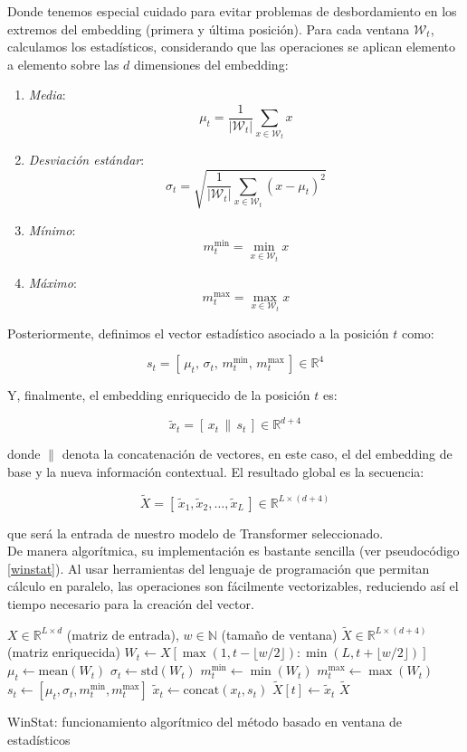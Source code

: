 Donde tenemos especial cuidado para evitar problemas de desbordamiento en los extremos del embedding (primera y última posición). Para cada ventana $\mathcal{W}_t$, calculamos los estadísticos, considerando que las operaciones se aplican elemento a elemento sobre las $d$ dimensiones del embedding:

\begin{enumerate}
	\item \textit{Media}:
	\[
	\mu_t = \frac{1}{|\mathcal{W}_t|} \sum_{x \in \mathcal{W}_t} x
	\]
	\item \textit{Desviación estándar}:
	\[
	\sigma_t = \sqrt{ \frac{1}{|\mathcal{W}_t|} \sum_{x \in \mathcal{W}_t} (x - \mu_t)^2 }
	\]
	\item \textit{Mínimo}:
	\[
	m^{\min}_t = \min_{x \in \mathcal{W}_t} x
	\]
	\item \textit{Máximo}:
	\[
	m^{\max}_t = \max_{x \in \mathcal{W}_t} x
	\]
\end{enumerate}

Posteriormente, definimos el vector estadístico asociado a la posición $t$ como:

\[
s_t = [\,\mu_t,\, \sigma_t,\, m^{\min}_t,\, m^{\max}_t\,] \in \mathbb{R}^{4}
\]

Y, finalmente, el embedding enriquecido de la posición $t$ es:

\[
\tilde{x}_t = [\,x_t \, \| \, s_t\,] \in \mathbb{R}^{d+4}
\]

donde $\|$ denota la concatenación de vectores, en este caso, el del embedding de base y la nueva información contextual. El resultado global es la secuencia:

\[
\tilde{X} = [\,\tilde{x}_1, \tilde{x}_2, \dots, \tilde{x}_L\,] \in \mathbb{R}^{L \times (d+4)}
\]

que será la entrada de nuestro modelo de Transformer seleccionado.\\

De manera algorítmica, su implementación es bastante sencilla (ver pseudocódigo \ref{winstat}). Al usar herramientas del lenguaje de programación que permitan cálculo en paralelo, las operaciones son fácilmente vectorizables, reduciendo así el tiempo necesario para la creación del vector.



\begin{algorithm}[H]
	\begin{algorithmic}[1]
		\REQUIRE $X \in \mathbb{R}^{L \times d}$ (matriz de entrada), $w \in \mathbb{N}$ (tamaño de ventana)
		\ENSURE $\tilde{X} \in \mathbb{R}^{L \times (d+4)}$ (matriz enriquecida)
		\STATE $W_t \gets X[\max(1, t - \lfloor w/2 \rfloor) : \min(L, t + \lfloor w/2 \rfloor)]$
		\STATE $\mu_t \gets \text{mean}(W_t)$
		\STATE $\sigma_t \gets \text{std}(W_t)$
		\STATE $m^{\min}_t \gets \min(W_t)$
		\STATE $m^{\max}_t \gets \max(W_t)$
		\STATE $s_t \gets [\mu_t, \sigma_t, m^{\min}_t, m^{\max}_t]$
		\STATE $\tilde{x}_t \gets \text{concat}(x_t, s_t)$
		\STATE $\tilde{X}[t] \gets \tilde{x}_t$
		\ENDFOR
		\RETURN $\tilde{X}$
	\end{algorithmic}
	\caption{WinStat: funcionamiento algorítmico del método basado en ventana de estadísticos}
	\label{winstat}
\end{algorithm}

